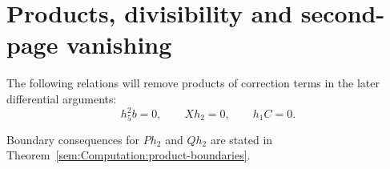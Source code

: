 \section{Products, divisibility and second-page vanishing}


\begin{theorem}
\label{sem:Computation:products-vanishing}
The following relations will remove products of correction terms in
the later differential arguments:
\[h_5^2b=0,\qquad Xh_2=0,\qquad h_1C=0.\]
\end{theorem}
Boundary consequences for $Ph_2$ and $Qh_2$ are stated in
Theorem~\ref{sem:Computation:product-boundaries}.

